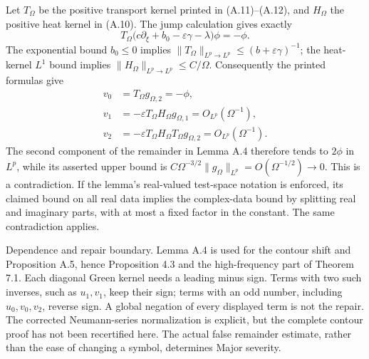 \documentclass[10pt]{article}
\begin{document}
Let \(T_\Omega\) be the positive transport kernel printed in (A.11)–(A.12), and \(H_\Omega\) the positive heat kernel in (A.10). The jump calculation gives exactly \[T_\Omega\bigl(c\partial_\xi+b_0-\varepsilon\gamma-\lambda\bigr)\phi
 =-\phi.\] The exponential bound \(b_0\le0\) implies \(\|T_\Omega\|_{L^p\to L^p}\le(b+\varepsilon\gamma)^{-1}\); the heat-kernel \(L^1\) bound implies \(\|H_\Omega\|_{L^p\to L^p}\le C/\Omega\). Consequently the printed formulas give \[\begin{aligned}
 v_0&=T_\Omega g_{\Omega,2}=-\phi,\\
 v_1&=-\varepsilon T_\Omega H_\Omega g_{\Omega,1}=O_{L^p}(\Omega^{-1}),\\
 v_2&=-\varepsilon T_\Omega H_\Omega T_\Omega g_{\Omega,2}
       =O_{L^p}(\Omega^{-1}).
 \end{aligned}\] The second component of the remainder in Lemma A.4 therefore tends to \(2\phi\) in \(L^p\), while its asserted upper bound is \(C\Omega^{-3/2}\|g_\Omega\|_{L^p}=O(\Omega^{-1/2})\to0\). This is a contradiction. If the lemma’s real-valued test-space notation is enforced, its claimed bound on all real data implies the complex-data bound by splitting real and imaginary parts, with at most a fixed factor in the constant. The same contradiction applies.\par
Dependence and repair boundary. Lemma A.4 is used for the contour shift and Proposition A.5, hence Proposition 4.3 and the high-frequency part of Theorem 7.1. Each diagonal Green kernel needs a leading minus sign. Terms with two such inverses, such as \(u_1,v_1\), keep their sign; terms with an odd number, including \(u_0,v_0,v_2\), reverse sign. A global negation of every displayed term is not the repair. The corrected Neumann-series normalization is explicit, but the complete contour proof has not been recertified here. The actual false remainder estimate, rather than the ease of changing a symbol, determines Major severity.\par
\end{document}
